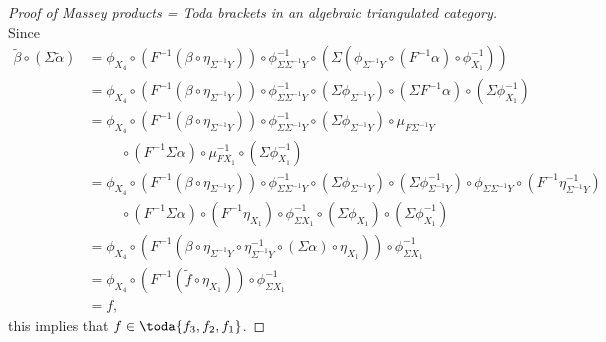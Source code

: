 \begin{proof}[Proof of Massey products = Toda brackets in an algebraic triangulated category]
    Since
    \begin{align*}
        \tilde{\beta} \circ (\Sigma \tilde{\alpha}) &= \phi_{X_4} \circ (F^{-1} (\beta \circ \eta_{\Sigma^{-1} Y})) \circ \phi^{-1}_{\Sigma \Sigma^{-1} Y} \circ
        (\Sigma (\phi_{\Sigma^{-1} Y} \circ (F^{-1} \alpha) \circ \phi^{-1}_{X_1})) \\
        &= \phi_{X_4} \circ (F^{-1} (\beta \circ \eta_{\Sigma^{-1} Y})) \circ \phi^{-1}_{\Sigma \Sigma^{-1} Y} \circ
        (\Sigma \phi_{\Sigma^{-1} Y}) \circ (\Sigma F^{-1} \alpha) \circ (\Sigma \phi^{-1}_{X_1}) \\
        &= \phi_{X_4} \circ (F^{-1} (\beta \circ \eta_{\Sigma^{-1} Y})) \circ \phi^{-1}_{\Sigma \Sigma^{-1} Y} \circ
        (\Sigma \phi_{\Sigma^{-1} Y}) \circ \mu_{F \Sigma^{-1} Y} \\
        &\hspace{1cm} \circ (F^{-1} \Sigma \alpha) \circ \mu^{-1}_{F X_1} \circ (\Sigma \phi^{-1}_{X_1}) \\
        &= \phi_{X_4} \circ (F^{-1} (\beta \circ \eta_{\Sigma^{-1} Y})) \circ \phi^{-1}_{\Sigma \Sigma^{-1} Y} \circ
        (\Sigma \phi_{\Sigma^{-1} Y}) \circ (\Sigma \phi^{-1}_{\Sigma^{-1} Y}) \circ \phi_{\Sigma \Sigma^{-1} Y} \circ (F^{-1} \eta^{-1}_{\Sigma^{-1} Y}) \\
        &\hspace{1cm} \circ (F^{-1} \Sigma \alpha) \circ (F^{-1} \eta_{X_1}) \circ \phi^{-1}_{\Sigma X_1} \circ (\Sigma \phi_{X_1}) \circ (\Sigma \phi^{-1}_{X_1}) \\
        &= \phi_{X_4} \circ (F^{-1} (\beta \circ \eta_{\Sigma^{-1} Y} \circ \eta^{-1}_{\Sigma^{-1} Y} \circ (\Sigma \alpha) \circ \eta_{X_1})) \circ \phi^{-1}_{\Sigma X_1} \\
        &= \phi_{X_4} \circ (F^{-1} (\tilde{f} \circ \eta_{X_1})) \circ \phi^{-1}_{\Sigma X_1} \\
        &= f,
    \end{align*}
    this implies that \( f \in \toda{f_3, f_2, f_1} \).
\end{proof}
